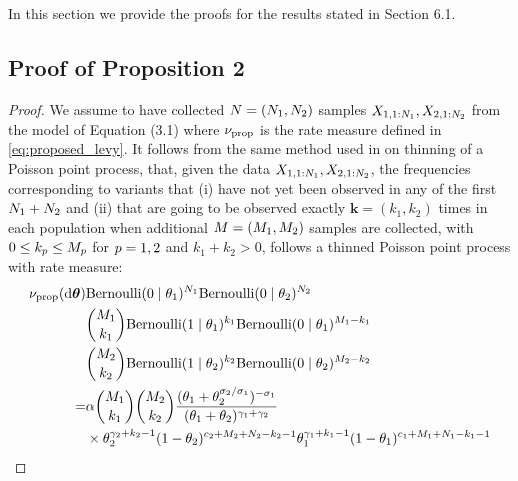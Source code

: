 
In this section we provide the proofs for the results stated in Section 6.1.

\subsection{Proof of Proposition 2}
\label{sec:kton_proof}

\begin{proof}
    We assume to have collected $\vecsamplesize= (\samplesize{1}, \samplesize{2})$ samples $X_{1,1:N_{1}}, X_{2, 1:N_{2}}$ from the model of Equation (3.1) where $\nu_{\mathrm{prop}}$ is  the rate measure defined in \cref{eq:proposed_levy}. It follows from the same method used in \citet[Proposition 2]{Masoero2022} on thinning of a Poisson point process, that, given the data $X_{1,1:N_{1}}, X_{2,1:N_{2}}$, the  frequencies corresponding to variants that (i) have not yet been observed in any of the first $N_{1}+N_{2}$ and (ii) that are going to be observed exactly $\bm{k} = (k_1, k_2)$ times in each population when additional $\vecfuturesamplesize = (\futuresamplesize{1}, \futuresamplesize{2})$ samples are collected, with $0 \le k_{p} \le M_{p}$ for $p = 1, 2$ and $k_1+k_2>0$, follows a thinned Poisson point process with rate measure:
\begin{equation}
    \begin{aligned}
    \ratemeasproposed(\de\boldsymbol{\theta})&\Bernoulli(0 \mid \variantfreqperpop{1})^{\samplesize{1}}\Bernoulli(0 \mid \variantfreqperpop{2})^{\samplesize{2}}\\
    &\binom{\futuresamplesize{1}}{\occurrence{1}}\Bernoulli(1 \mid \variantfreqperpop{1})^{\occurrence{1}}\Bernoulli(0 \mid \variantfreqperpop{1})^{\futuresamplesize{1}-\occurrence{1}}\\
    & \binom{\futuresamplesize{2}}{\occurrence{2}}\Bernoulli(1 \mid \variantfreqperpop{2})^{\occurrence{2}}\Bernoulli(0 \mid \variantfreqperpop{2})^{\futuresamplesize{2}-\occurrence{2}}\\
    =&\mass\binom{\futuresamplesize{1}}{\occurrence{1}}\binom{\futuresamplesize{2}}{\occurrence{2}}\frac{(\variantfreqperpop{1}+\variantfreqperpop{2}^{\rate{2}/\rate{1}})^{-\rate{1}}}{(\variantfreqperpop{1}+\variantfreqperpop{2})^{\corr{1}+\corr{2}}}\\ 
    &\times\variantfreqperpop{2}^{\corr{2}+\occurrence{2}-1}(1-\variantfreqperpop{2})^{\conc{2}+\futuresamplesize{2}+\samplesize{2}-\occurrence{2}-1}\variantfreqperpop{1}^{\corr{1}+\occurrence{1}-1}(1-\variantfreqperpop{1})^{\conc{1}+\futuresamplesize{1}+\samplesize{1}-\occurrence{1}-1}\\

\end{aligned}
\end{equation}
\end{proof}
